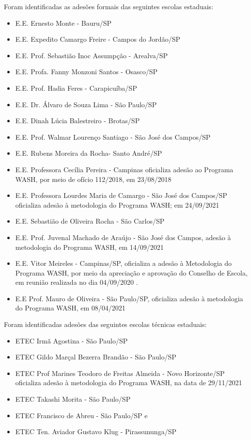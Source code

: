 Foram identificadas as adesões formais das seguintes escolas estaduais:


\begin{itemize}
\item E.E. Ernesto Monte - Bauru/SP
\item E.E. Expedito Camargo Freire - Campos do Jordão/SP
\item E.E. Prof. Sebastião Inoc Assumpção - Arealva/SP
\item E.E. Profa. Fanny Monzoni Santos - Osasco/SP
\item E.E. Prof. Hadia Feres - Carapicuíba/SP
\item E.E. Dr. Álvaro de Souza Lima - São Paulo/SP
\item E.E. Dinah Lúcia Balestreiro - Brotas/SP  
\item E.E. Prof. Walmar Lourenço Santiago - São José dos Campos/SP
\item E.E. Rubens Moreira da Rocha- Santo André/SP
\item E.E. Professora Cecília Pereira - Campinas oficializa adesão ao Programa WASH, por meio de ofício 112/2018, em 23/08/2018
\item E.E. Professora Lourdes Maria de Camargo - São José dos Campos/SP oficializa adesão à metodologia do Programa WASH; em 24/09/2021
\item E.E. Sebastião de Oliveira Rocha - São Carlos/SP
\item E.E. Prof. Juvenal Machado de Araújo - São José dos Campos, adesão à metodologia do Programa WASH, em 14/09/2021
\item E.E. Vitor Meireles - Campinas/SP, oficializa a adesão à Metodologia do Programa WASH, por meio da apreciação e aprovação do Conselho de Escola, em reunião realizada no dia  04/09/2020 .
\item E.E Prof. Mauro de Oliveira - São Paulo/SP, oficializa adesão à metodologia do Programa WASH, em 08/04/2021
\end{itemize}

Foram identificadas adesões das seguintes escolas técnicas estaduais:


\begin{itemize}
\item ETEC Irmã Agostina - São Paulo/SP
\item ETEC Gildo Marçal Bezerra Brandão - São Paulo/SP
\item ETEC Prof Marines Teodoro de Freitas Almeida - Novo Horizonte/SP oficializa adesão à metodologia do Programa WASH, na data de 29/11/2021
\item ETEC Takashi Morita - São Paulo/SP
\item ETEC Francisco de Abreu - São Paulo/SP e
\item ETEC Ten. Aviador Gustavo Klug - Pirassununga/SP
\end{itemize}

